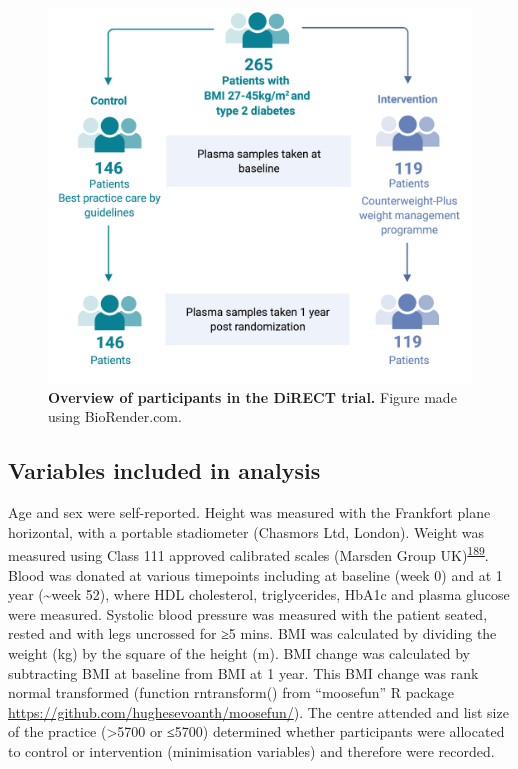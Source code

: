 \documentclass[11pt,twoside]{bristolthesis}
\begin{document}
\begin{figure}

{\centering \includegraphics{figure/DiRECT/DiRECT_study_summary} 

}

\caption[Overview of participants in the DiRECT trial]{\textbf{Overview of participants in the DiRECT trial.} Figure made using BioRender.com.}\label{fig:direct-participants}
\end{figure}
\hypertarget{variables-included-in-analysis}{%
\subsection{Variables included in analysis}\label{variables-included-in-analysis}}

Age and sex were self-reported. Height was measured with the Frankfort plane horizontal, with a portable stadiometer (Chasmors Ltd, London). Weight was measured using Class 111 approved calibrated scales (Marsden Group UK)\textsuperscript{\protect\hyperlink{ref-Leslie2016}{189}}. Blood was donated at various timepoints including at baseline (week 0) and at 1 year (\textasciitilde week 52), where HDL cholesterol, triglycerides, HbA1c and plasma glucose were measured. Systolic blood pressure was measured with the patient seated, rested and with legs uncrossed for ≥5 mins. BMI was calculated by dividing the weight (kg) by the square of the height (m). BMI change was calculated by subtracting BMI at baseline from BMI at 1 year. This BMI change was rank normal transformed (function rntransform() from ``moosefun'' R package \url{https://github.com/hughesevoanth/moosefun/}). The centre attended and list size of the practice (\textgreater5700 or ≤5700) determined whether participants were allocated to control or intervention (minimisation variables) and therefore were recorded.
\end{document}
